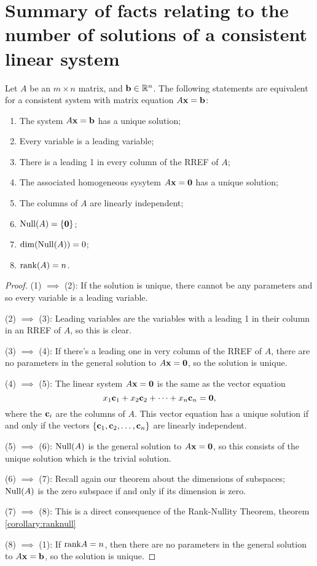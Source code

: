 \section[Summary of facts relating to the number of solutions]{Summary of facts relating to the number of solutions of a consistent linear system}
\label{section:uniqesol}
\begin{theorem}\label{thm:uniquesol}
Let $A$ be an $m\times n$ matrix, and $\mathbf{b}\in \mathbb{R}^n$.
The following statements are equivalent for a consistent system with matrix equation $A\mathbf{x}=\mathbf{b}$: 
\begin{enumerate}[(1)]

\item The system $A\mathbf{x} = \mathbf{b}$ has a unique solution; 
\item Every variable is a leading variable; 
\item There is a leading 1 in every column of the RREF of $A$; 

\item The associated homogeneous sysytem $A\mathbf{x} = \mathbf{0}$ has a unique solution;  \item The columns of $A$ are linearly independent; 
\item $\operatorname{Null}(A) = \{\mathbf{0}\}$; 
\item $\dim(\operatorname{Null}(A)) = 0$; 
\item $\operatorname{rank}(A)= n$.
\end{enumerate}
\end{theorem}
\begin{proof}
(1) $\implies$ (2): If the solution is unique, there cannot be any parameters and so  every variable is a leading variable.

(2) $\implies$ (3): Leading variables are the variables with a leading 1 in their column in an RREF of $A$, so this is clear.

(3) $\implies$ (4): If there's a leading one in very column of the RREF of $A$, there are no parameters in the general solution to $A\mathbf{x} = \mathbf{0}$, so the solution is unique.


(4) $\implies$ (5): The linear system $A\mathbf{x} = \mathbf{0}$ is the same as the vector equation
$$
x_1 \mathbf{c}_1 + x_2\mathbf{c}_2+ \cdots + x_n\mathbf{c}_n = \mathbf{0},
$$
where the $\mathbf{c}_i$ are the columns of $A$. 
This vector equation has a unique solution if and only if the vectors $\{ \mathbf{c}_1,\mathbf{c}_2, \ldots, \mathbf{c}_n\}$ are linearly independent.

(5) $\implies$ (6): $\operatorname{Null}(A)$ is the general solution to $A\mathbf{x} = \mathbf{0}$, so this consists of the unique solution which is the trivial solution.

(6) $\implies$ (7): Recall again our theorem about the dimensions of
subspaces; $\operatorname{Null}(A)$ is the zero subspace if and only if its dimension is
zero.

(7) $\implies$ (8): This is a direct consequence of the Rank-Nullity Theorem, theorem \ref{corollary:ranknull}


(8) $\implies$ (1): If $\textrm{rank} A=n$, then there are no parameters in the general solution to $A \mathbf{x}=\mathbf{b}$, so the solution is unique.
\end{proof}

